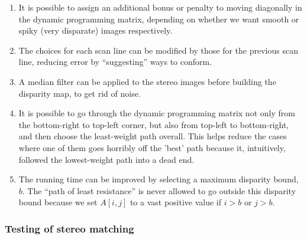 \begin{enumerate}
\item It is possible to assign an additional bonus or penalty to moving
  diagonally in the dynamic programming matrix, depending on whether we want
  smooth or spiky (very disparate) images respectively.

\item The choices for each scan line can be modified by those for the previous
  scan line, reducing error by ``suggesting'' ways to conform.

\item A median filter can be applied to the stereo images before building the
  disparity map, to get rid of noise.

\item It is possible to go through the dynamic programming matrix not only from
  the bottom-right to top-left corner, but also from top-left to bottom-right,
  and then choose the least-weight path overall. This helps reduce the cases
  where one of them goes horribly off the 'best' path because it, intuitively,
  followed the lowest-weight path into a dead end.

\item The running time can be improved by selecting a maximum disparity bound,
  $b$. The ``path of least resistance'' is never allowed to go outside this
  disparity bound because we set $A[i,j]$ to a vast positive value if $i > b$ or
  $j > b$.
\end{enumerate}




\subsubsection{Testing of stereo matching}

